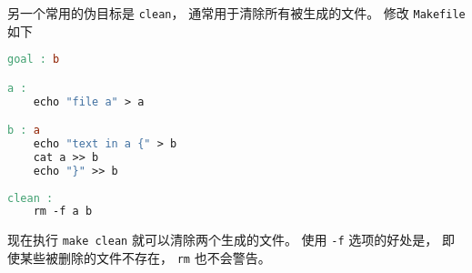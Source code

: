 另一个常用的伪目标是 \verb`clean`， 通常用于清除所有被生成的文件。 修改 \verb`Makefile` 如下
\begin{lstlisting}[language=makefile]
goal : b

a :
	echo "file a" > a

b : a
	echo "text in a {" > b
	cat a >> b
	echo "}" >> b
    
clean :
	rm -f a b
\end{lstlisting}
现在执行 \verb`make clean` 就可以清除两个生成的文件。 使用 \verb`-f` 选项的好处是， 即使某些被删除的文件不存在， \verb`rm` 也不会警告。

